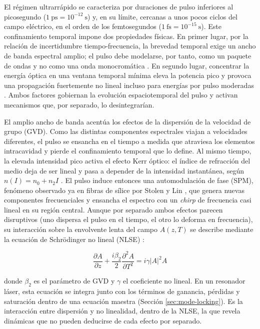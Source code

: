 El régimen ultrarrápido se caracteriza por duraciones de pulso inferiores al picosegundo ($1~\mathrm{ps}=10^{-12}~\mathrm{s}$) y, en su límite, cercanas a unos pocos ciclos del campo eléctrico, en el orden de los femtosegundos ($1~\mathrm{fs}=10^{-15}~\mathrm{s}$). Este confinamiento temporal impone dos propiedades físicas. En primer lugar, por la relación de incertidumbre tiempo-frecuencia, la brevedad temporal exige un ancho de banda espectral amplio; el pulso debe modelarse, por tanto, como un paquete de ondas y no como una onda monocromática \cite{Keller2022}. En segundo lugar, concentrar la energía óptica en una ventana temporal mínima eleva la potencia pico y provoca una propagación fuertemente no lineal incluso para energías por pulso moderadas \cite{Agrawal2019}. Ambos factores gobiernan la evolución espaciotemporal del pulso y activan mecanismos que, por separado, lo desintegrarían.

El amplio ancho de banda acentúa los efectos de la dispersión de la velocidad de grupo (GVD). Como las distintas componentes espectrales viajan a velocidades diferentes, el pulso se ensancha en el tiempo a medida que atraviesa los elementos intracavidad y pierde el confinamiento temporal que lo define. Al mismo tiempo, la elevada intensidad pico activa el efecto Kerr óptico: el índice de refracción del medio deja de ser lineal y pasa a depender de la intensidad instantánea, según $n(I) = n_0 + n_2 I$ \cite{Agrawal2019}. El pulso induce entonces una automodulación de fase (SPM), fenómeno observado ya en fibras de sílice por Stolen y Lin \cite{StolenLin1978}, que genera nuevas componentes frecuenciales y ensancha el espectro con un \emph{chirp} de frecuencia casi lineal en su región central. Aunque por separado ambos efectos parecen disruptivos (uno dispersa el pulso en el tiempo, el otro lo deforma en frecuencia), su interacción sobre la envolvente lenta del campo $A(z,T)$ se describe mediante la ecuación de Schrödinger no lineal (NLSE) \cite{Agrawal2019}:

\begin{equation}
  \frac{\partial A}{\partial z} + \frac{i\beta_2}{2}\frac{\partial^2 A}{\partial T^2} = i\gamma|A|^2 A  
\end{equation}

donde $\beta_2$ es el parámetro de GVD y $\gamma$ el coeficiente no lineal. En un resonador láser, esta ecuación se integra junto con los términos de ganancia, pérdidas y saturación dentro de una ecuación maestra (Sección \ref{sec:mode-locking}). Es la interacción entre dispersión y no linealidad, dentro de la NLSE, la que revela dinámicas que no pueden deducirse de cada efecto por separado.

